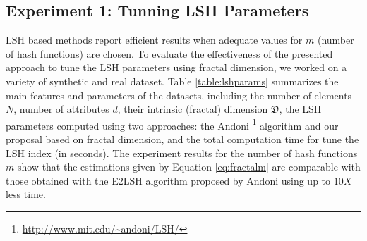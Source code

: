 \documentclass{article}
\begin{document}
\subsection{Experiment 1: Tunning LSH Parameters}

LSH based methods report efficient results when adequate values for $m$ (number of hash functions) are chosen. To evaluate the effectiveness of the presented approach to tune the LSH parameters using fractal dimension, we worked on a variety of synthetic and real dataset. Table \ref{table:lshparams} summarizes the main features and parameters of the datasets, including the number of elements $N$, number of attributes $d$,   their intrinsic (fractal) dimension $\mathfrak{D}$, the LSH parameters computed using two approaches: the Andoni \footnote{\url{http://www.mit.edu/~andoni/LSH/}} algorithm and our proposal based on fractal dimension, and the total computation time for tune the LSH index (in seconds).  The experiment results for the number of hash functions $m$  show that the estimations given by Equation \ref{eq:fractalm} are comparable with those obtained with the E2LSH algorithm proposed by Andoni using up to $10X$ less time.
 
\end{document}
